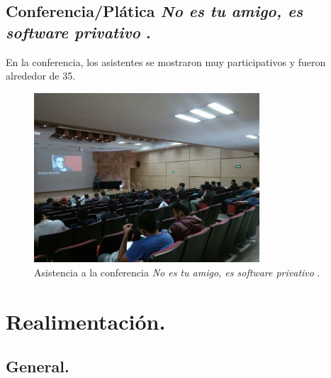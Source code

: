 \documentclass[a4paper,11pt]{article}                 %
\begin{document}
  \subsection{Conferencia/Plática\textit{ No es tu amigo, es software privativo }.}  
       En la conferencia, los asistentes se mostraron muy participativos y fueron alrededor de 35. 
         \begin{figure}[H]
    \begin{center}
      \includegraphics[width=0.75\textwidth]{images/privativo-01}
      \caption{Asistencia a la conferencia \textit{No es tu amigo, es software privativo} .}
      \label{fig:privativo-01}
    \end{center}
  \end{figure}  
  
  \newpage
  
       \section{Realimentación.}
  \subsection{General.}
  
\end{document}
